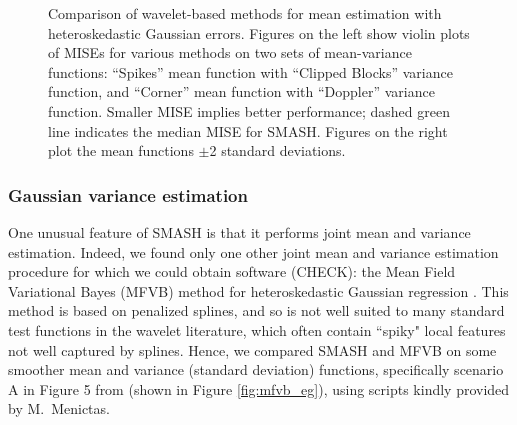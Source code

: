 \documentclass[12pt]{article}
\begin{document}
\begin{figure}
\begin{subfigure}[b]{0.3\textwidth}
        \caption{}
        \label{fig:gaus_hetero_sd_2}
    \end{subfigure}
    \caption{Comparison of wavelet-based methods for mean estimation with heteroskedastic Gaussian errors. Figures on the left show violin plots of MISEs for various methods on two sets of mean-variance functions: ``Spikes'' mean function with ``Clipped Blocks'' variance function, and ``Corner'' mean function with ``Doppler'' variance function. Smaller MISE implies better performance; dashed green line indicates the median MISE for SMASH. Figures on the right plot the mean functions $\pm$2 standard deviations.}
    \label{fig:gaus_hetero}
\end{figure}


\subsubsection{Gaussian variance estimation}\label{sec:mfvb}

One unusual feature of SMASH is that it performs joint mean and variance estimation.
Indeed, we found only one other joint mean and variance estimation procedure for which we could obtain software (CHECK):
the Mean Field Variational Bayes (MFVB) method for heteroskedastic Gaussian regression \cite{Menictas2015Variational}. 
This method is based on penalized splines, and so is not well suited to many standard test functions in the wavelet literature, which
often contain ``spiky" local features not well captured by splines. Hence, we compared SMASH and MFVB on some
smoother mean and variance (standard deviation) functions, specifically scenario A in Figure 5 from \cite{Menictas2015Variational} (shown in Figure \ref{fig:mfvb_eg}),
using scripts kindly provided by M.~Menictas.
\end{document}
